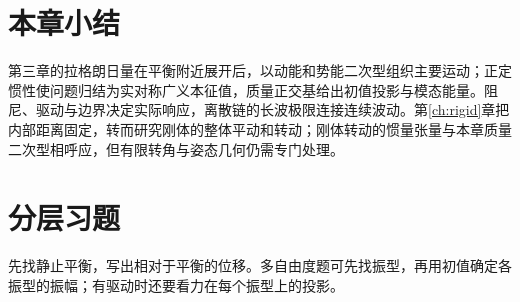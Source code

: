 \section*{本章小结}
第三章的拉格朗日量在平衡附近展开后，以动能和势能二次型组织主要运动；正定惯性使问题归结为实对称广义本征值，质量正交基给出初值投影与模态能量。阻尼、驱动与边界决定实际响应，离散链的长波极限连接连续波动。第\ref{ch:rigid}章把内部距离固定，转而研究刚体的整体平动和转动；刚体转动的惯量张量与本章质量二次型相呼应，但有限转角与姿态几何仍需专门处理。


\section*{分层习题}
先找静止平衡，写出相对于平衡的位移。多自由度题可先找振型，再用初值确定各振型的振幅；有驱动时还要看力在每个振型上的投影。


